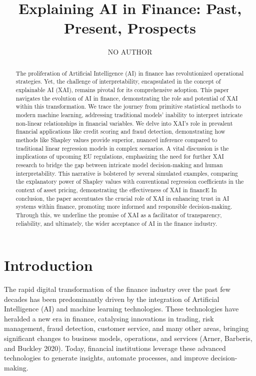 \documentclass[
  letterpaper,
  DIV=11,
  numbers=noendperiod]{scrartcl}
\title{Explaining AI in Finance: Past, Present, Prospects}
\author{NO AUTHOR}
\date{}
\begin{document}
\maketitle
\begin{abstract}
The proliferation of Artificial Intelligence (AI) in finance has
revolutionized operational strategies. Yet, the challenge of
interpretability, encapsulated in the concept of explainable AI (XAI),
remains pivotal for its comprehensive adoption. This paper navigates the
evolution of AI in finance, demonstrating the role and potential of XAI
within this transformation. We trace the journey from primitive
statistical methods to modern machine learning, addressing traditional
models' inability to interpret intricate non-linear relationships in
financial variables. We delve into XAI's role in prevalent financial
applications like credit scoring and fraud detection, demonstrating how
methods like Shapley values provide superior, nuanced inference compared
to traditional linear regression models in complex scenarios. A vital
discussion is the implications of upcoming EU regulations, emphasizing
the need for further XAI research to bridge the gap between intricate
model decision-making and human interpretability. This narrative is
bolstered by several simulated examples, comparing the explanatory power
of Shapley values with conventional regression coefficients in the
context of asset pricing, demonstrating the effectiveness of XAI in
financE In conclusion, the paper accentuates the crucial role of XAI in
enhancing trust in AI systems within finance, promoting more informed
and responsible decision-making. Through this, we underline the promise
of XAI as a facilitator of transparency, reliability, and ultimately,
the wider acceptance of AI in the finance industry.
\end{abstract}
\ifdefined\Shaded\renewenvironment{Shaded}{\begin{tcolorbox}[frame hidden, enhanced, sharp corners, interior hidden, borderline west={3pt}{0pt}{shadecolor}, boxrule=0pt, breakable]}{\end{tcolorbox}}\fi

\hypertarget{introduction}{%
\section{Introduction}\label{introduction}}

The rapid digital transformation of the finance industry over the past
few decades has been predominantly driven by the integration of
Artificial Intelligence (AI) and machine learning technologies. These
technologies have heralded a new era in finance, catalysing innovations
in trading, risk management, fraud detection, customer service, and many
other areas, bringing significant changes to business models,
operations, and services (Arner, Barberis, and Buckley 2020). Today,
financial institutions leverage these advanced technologies to generate
insights, automate processes, and improve decision-making.
\end{document}
